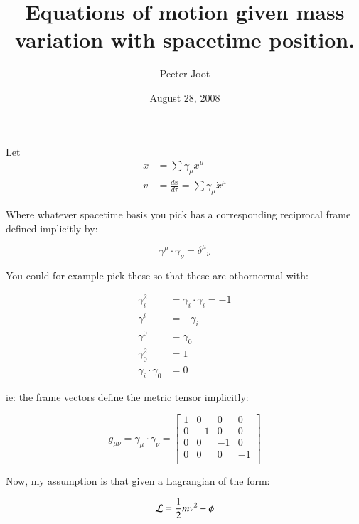 \documentclass{article}      %
\title{ Equations of motion given mass variation with spacetime position. } %
\author{Peeter Joot}         %
\date{August 28, 2008}        %
\newcommand{\LL}[0]{\mathcal{L}}
\newcommand{\xdot}[0]{\dot{x}}
\begin{document}

\maketitle{}

\section{}

Let
\begin{align*}
x &= \sum \gamma_{\mu} {x}^{\mu} \\
v &= \frac{dx}{d\tau} = \sum \gamma_{\mu} \xdot^{\mu}
\end{align*}

Where whatever spacetime basis you pick has a corresponding reciprocal frame defined implicitly by:

\begin{equation*}
\gamma^{\mu} \cdot \gamma_{\nu} = {\delta^{\mu}}_{\nu}
\end{equation*}

You could for example pick these so that these are othornormal with:

\begin{align*}
\gamma_{i}^2 &= \gamma_i \cdot \gamma_i = -1 \\
\gamma^{i} &= -\gamma_{i} \\
\gamma^{0} &= \gamma_{0} \\
\gamma_{0}^2 &= 1 \\
\gamma_{i} \cdot \gamma_0 &= 0
\end{align*}

ie: the frame vectors define the metric tensor implicitly:

\begin{equation*}
g_{\mu\nu} = \gamma_{\mu} \cdot \gamma_{\nu} =
\begin{bmatrix}
1 & 0 & 0 & 0 \\
0 & -1 & 0 & 0 \\
0 & 0 & -1 & 0 \\
0 & 0 & 0 & -1 \\
\end{bmatrix}
\end{equation*}

Now, my assumption is that given a Lagrangian of the form:

\begin{equation*}
\LL = \inv{2} m v^2 - \phi
\end{equation*}
\end{document}
